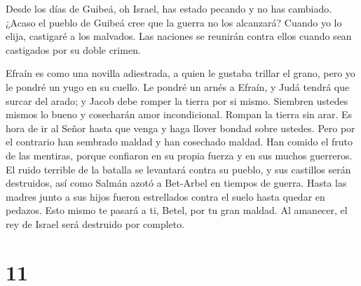  Desde los días de Guibeá, oh Israel, has estado pecando y
no has cambiado. ¿Acaso el pueblo de Guibeá cree que la guerra no los
alcanzará?  Cuando yo lo elija, castigaré a los malvados.
Las naciones se reunirán contra ellos cuando sean castigados por su
doble crimen.

 Efraín es como una novilla adiestrada, a quien le gustaba
trillar el grano, pero yo le pondré un yugo en su cuello. Le pondré un
arnés a Efraín, y Judá tendrá que surcar del arado; y Jacob debe romper
la tierra por si mismo.  Siembren ustedes mismos lo bueno y
cosecharán amor incondicional. Rompan la tierra sin arar. Es hora de ir
al Señor hasta que venga y haga llover bondad sobre ustedes.
 Pero por el contrario han sembrado maldad y han cosechado
maldad. Han comido el fruto de las mentiras, porque confiaron en su
propia fuerza y en sus muchos guerreros.  El ruido terrible
de la batalla se levantará contra su pueblo, y sus castillos serán
destruidos, así como Salmán azotó a Bet-Arbel en tiempos de guerra.
Hasta las madres junto a sus hijos fueron estrellados contra el suelo
hasta quedar en pedazos.  Esto mismo te pasará a ti, Betel,
por tu gran maldad. Al amanecer, el rey de Israel será destruido por
completo.

\hypertarget{section-10}{%
\section{11}\label{section-10}}

